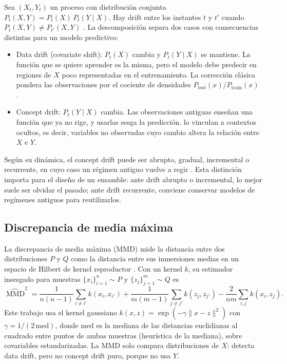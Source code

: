 \documentclass[11pt,a4paper]{article}
\newcommand{\MMD}{\operatorname{MMD}}
\begin{document}
Sea $(X_t, Y_t)$ un proceso con distribución conjunta $P_t(X,Y) = P_t(X)\,P_t(Y\mid X)$. Hay drift
entre los instantes $t$ y $t'$ cuando $P_t(X,Y)\neq P_{t'}(X,Y)$
\parencite{gama2014,lu2019}. La descomposición separa dos casos con consecuencias distintas para un
modelo predictivo:

\begin{itemize}
  \item Data drift (covariate shift): $P_t(X)$ cambia y $P_t(Y\mid X)$ se mantiene. La función que
  se quiere aprender es la misma, pero el modelo debe predecir en regiones de $X$ poco representadas
  en el entrenamiento. La corrección clásica pondera las observaciones por el cociente de densidades
  $P_{\text{test}}(x)/P_{\text{train}}(x)$ \parencite{shimodaira2000}.
  \item Concept drift: $P_t(Y\mid X)$ cambia. Las observaciones antiguas enseñan una función que ya no
  rige, y usarlas sesga la predicción. \textcite{widmer1996} lo vinculan a contextos ocultos, es decir,
  variables no observadas cuyo cambio altera la relación entre $X$ e $Y$.
\end{itemize}

Según su dinámica, el concept drift puede ser abrupto, gradual, incremental o recurrente, en cuyo
caso un régimen antiguo vuelve a regir \parencite{gama2014}. Esta distinción importa para el diseño
de un ensamble: ante drift abrupto o incremental, lo mejor suele ser olvidar el pasado; ante drift
recurrente, conviene conservar modelos de regímenes antiguos para reutilizarlos.

\subsection{Discrepancia de media máxima}

La discrepancia de media máxima (MMD) mide la distancia entre dos distribuciones $P$ y $Q$ como la
distancia entre sus inmersiones medias en un espacio de Hilbert de kernel reproductor
\parencite{gretton2012}. Con un kernel $k$, su estimador insesgado para muestras
$\{x_i\}_{i=1}^n\sim P$ y $\{z_j\}_{j=1}^m\sim Q$ es
\begin{equation}\label{eq:mmd}
\widehat{\MMD}^2 = \frac{1}{n(n-1)}\sum_{i\neq i'} k(x_i,x_{i'})
+ \frac{1}{m(m-1)}\sum_{j\neq j'} k(z_j,z_{j'})
- \frac{2}{nm}\sum_{i,j} k(x_i,z_j).
\end{equation}
Este trabajo usa el kernel gaussiano $k(x,z)=\exp(-\gamma\lVert x-z\rVert^2)$ con
$\gamma = 1/(2\,\mathrm{med})$, donde $\mathrm{med}$ es la mediana de las distancias euclidianas al
cuadrado entre puntos de ambas muestras (heurística de la mediana), sobre covariables estandarizadas.
La MMD solo compara distribuciones de $X$: detecta data drift, pero no concept drift puro, porque no
usa $Y$.
\end{document}
